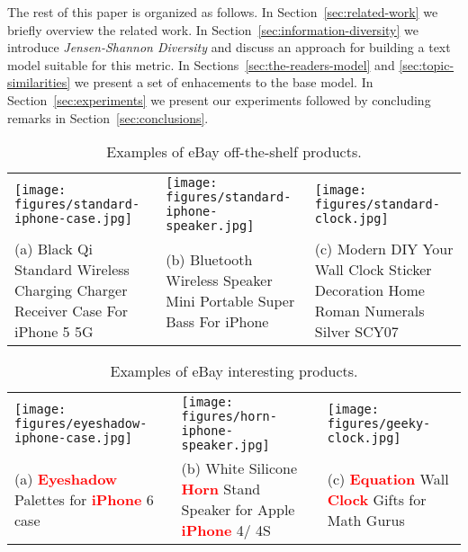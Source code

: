 The rest of this paper is organized as follows. In Section~\ref{sec:related-work} we briefly overview the related work. In Section~\ref{sec:information-diversity} we introduce {\em Jensen-Shannon Diversity} and discuss an approach for building a text model suitable for this metric. In Sections~\ref{sec:the-readers-model} and \ref{sec:topic-similarities} we present a set of enhacements to the base model. In Section~\ref{sec:experiments} we present our experiments followed by concluding remarks in Section~\ref{sec:conclusions}.

\begin{table*}[t]
\begin{center}
\begin{tabular}{LLL}
\texttt{[image: figures/standard-iphone-case.jpg]}&\texttt{[image: figures/standard-iphone-speaker.jpg]}&\texttt{[image: figures/standard-clock.jpg]}\\
(a) Black Qi Standard Wireless Charging Charger Receiver Case For iPhone 5 5G & (b) Bluetooth Wireless Speaker Mini Portable Super Bass For iPhone & (c) Modern DIY Your Wall Clock Sticker Decoration Home Roman Numerals Silver SCY07\\
\end{tabular}
\end{center}
\caption{Examples of eBay off-the-shelf products.}
\label{tab:ebay-standard-products}
\end{table*}


\begin{table*}[t]
\begin{center}
\begin{tabular}{LLL}
\texttt{[image: figures/eyeshadow-iphone-case.jpg]}&\texttt{[image: figures/horn-iphone-speaker.jpg]}&\texttt{[image: figures/geeky-clock.jpg]}\\
(a) \textcolor{red}{{\bf Eyeshadow}} Palettes for \textcolor{red}{{\bf iPhone}} 6 case & (b) White Silicone \textcolor{red}{{\bf Horn}} Stand Speaker for Apple \textcolor{red}{{\bf iPhone}} 4/ 4S& (c) \textcolor{red}{{\bf Equation}} Wall \textcolor{red}{{\bf Clock}} Gifts for Math Gurus\\
\end{tabular}
\end{center}
\caption{Examples of eBay interesting products.}
\label{tab:ebay-interesting-products}
\end{table*}